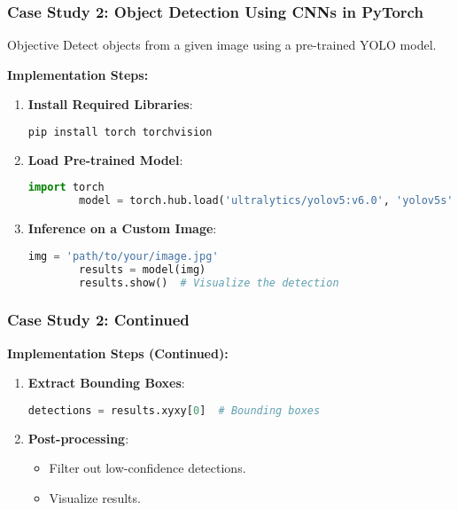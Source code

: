 \documentclass[aspectratio=169]{beamer}
\begin{document}
\begin{frame}[fragile]
    \frametitle{Case Study 2: Object Detection Using CNNs in PyTorch}
    \begin{block}{Objective}
        Detect objects from a given image using a pre-trained YOLO model.
    \end{block}
    
    \textbf{Implementation Steps:}
    \begin{enumerate}
        \item \textbf{Install Required Libraries}:
        \begin{lstlisting}[language=sh]
        pip install torch torchvision
        \end{lstlisting}
        
        \item \textbf{Load Pre-trained Model}:
        \begin{lstlisting}[language=Python]
        import torch
        model = torch.hub.load('ultralytics/yolov5:v6.0', 'yolov5s', pretrained=True)
        \end{lstlisting}
        
        \item \textbf{Inference on a Custom Image}:
        \begin{lstlisting}[language=Python]
        img = 'path/to/your/image.jpg'
        results = model(img)
        results.show()  # Visualize the detection
        \end{lstlisting}
    \end{enumerate}
\end{frame}

\begin{frame}[fragile]
    \frametitle{Case Study 2: Continued}
    \textbf{Implementation Steps (Continued):}
    \begin{enumerate}[resume]
        \item \textbf{Extract Bounding Boxes}:
        \begin{lstlisting}[language=Python]
        detections = results.xyxy[0]  # Bounding boxes
        \end{lstlisting}
        
        \item \textbf{Post-processing}:
        \begin{itemize}
            \item Filter out low-confidence detections.
            \item Visualize results.
        \end{itemize}
    \end{enumerate}
\end{frame}
\end{document}
